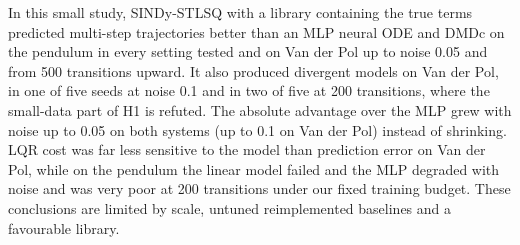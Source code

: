In this small study, SINDy-STLSQ with a library containing the true terms predicted multi-step trajectories better than an MLP neural ODE and DMDc on the pendulum in every setting tested and on Van der Pol up to noise 0.05 and from 500 transitions upward. It also produced divergent models on Van der Pol, in one of five seeds at noise 0.1 and in two of five at 200 transitions, where the small-data part of H1 is refuted. The absolute advantage over the MLP grew with noise up to 0.05 on both systems (up to 0.1 on Van der Pol) instead of shrinking. LQR cost was far less sensitive to the model than prediction error on Van der Pol, while on the pendulum the linear model failed and the MLP degraded with noise and was very poor at 200 transitions under our fixed training budget. These conclusions are limited by scale, untuned reimplemented baselines and a favourable library.
